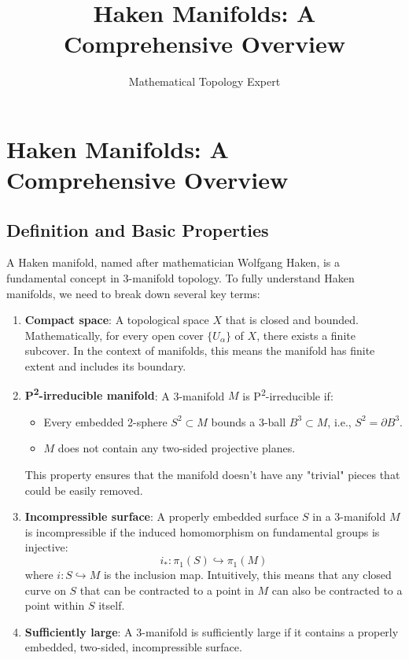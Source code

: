 \documentclass{article}
\title{Haken Manifolds: A Comprehensive Overview}
\author{Mathematical Topology Expert}
\begin{document}
\maketitle

\section{Haken Manifolds: A Comprehensive Overview}

\subsection{Definition and Basic Properties}

A Haken manifold, named after mathematician Wolfgang Haken, is a fundamental concept in 3-manifold topology. To fully understand Haken manifolds, we need to break down several key terms:

\begin{enumerate}
  \item \textbf{Compact space}: A topological space $X$ that is closed and bounded. Mathematically, for every open cover $\{U_\alpha\}$ of $X$, there exists a finite subcover. In the context of manifolds, this means the manifold has finite extent and includes its boundary.
  
  \item \textbf{P\textsuperscript{2}-irreducible manifold}: A 3-manifold $M$ is P\textsuperscript{2}-irreducible if:
  \begin{itemize}
    \item Every embedded 2-sphere $S^2 \subset M$ bounds a 3-ball $B^3 \subset M$, i.e., $S^2 = \partial B^3$.
    \item $M$ does not contain any two-sided projective planes.
  \end{itemize}
  This property ensures that the manifold doesn't have any "trivial" pieces that could be easily removed.
  
  \item \textbf{Incompressible surface}: A properly embedded surface $S$ in a 3-manifold $M$ is incompressible if the induced homomorphism on fundamental groups is injective:
  \[ i_* : \pi_1(S) \hookrightarrow \pi_1(M) \]
  where $i : S \hookrightarrow M$ is the inclusion map. Intuitively, this means that any closed curve on $S$ that can be contracted to a point in $M$ can also be contracted to a point within $S$ itself.
  
  \item \textbf{Sufficiently large}: A 3-manifold is sufficiently large if it contains a properly embedded, two-sided, incompressible surface.
\end{enumerate}
\end{document}
